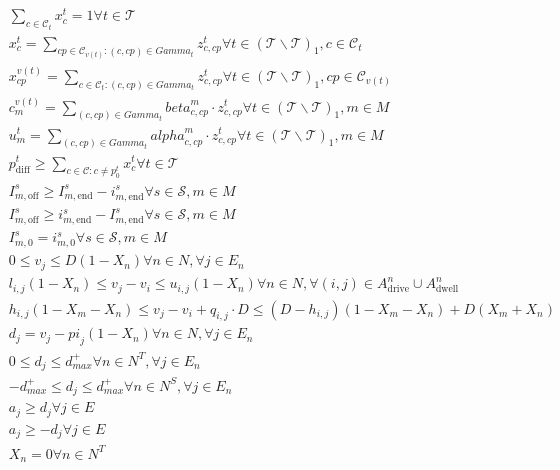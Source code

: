 \begin{align}
  & \sum_{c \in \mathcal{C}_{t}} x_{c}^{t} = 1 \forall t \in \mathcal{T} \tag{eq\_0003} \\
  & x_{c}^{t} = \sum_{cp \in \mathcal{C}_{v \left(t\right)} : \left(c , cp\right) \in \mathit{Gamma}_{t}} z_{c , cp}^{t} \forall t \in \left(\mathcal{T} \backslash \mathcal{T}\right)_{1} , c \in \mathcal{C}_{t} \tag{eq\_0004} \\
  & x_{cp}^{v \left(t\right)} = \sum_{c \in \mathcal{C}_{t} : \left(c , cp\right) \in \mathit{Gamma}_{t}} z_{c , cp}^{t} \forall t \in \left(\mathcal{T} \backslash \mathcal{T}\right)_{1} , cp \in \mathcal{C}_{v \left(t\right)} \tag{eq\_0005} \\
  & c_{m}^{v \left(t\right)} = \sum_{\left(c , cp\right) \in \mathit{Gamma}_{t}} \mathit{beta}_{c , cp}^{m} \cdot z_{c , cp}^{t} \forall t \in \left(\mathcal{T} \backslash \mathcal{T}\right)_{1} , m \in M \tag{eq\_0006} \\
  & u_{m}^{t} = \sum_{\left(c , cp\right) \in \mathit{Gamma}_{t}} \mathit{alpha}_{c , cp}^{m} \cdot z_{c , cp}^{t} \forall t \in \left(\mathcal{T} \backslash \mathcal{T}\right)_{1} , m \in M \tag{eq\_0007} \\
  & p_{\text{diff}}^{t} \geq \sum_{c \in \mathcal{C} : c \neq p_{0}^{t}} x_{c}^{t} \forall t \in \mathcal{T} \tag{eq\_0010} \\
  & I_{m , \text{off}}^{s} \geq I_{m , \text{end}}^{s} - i_{m , \text{end}}^{s} \forall s \in \mathcal{S} , m \in M \tag{eq\_0013} \\
  & I_{m , \text{off}}^{s} \geq i_{m , \text{end}}^{s} - I_{m , \text{end}}^{s} \forall s \in \mathcal{S} , m \in M \tag{eq\_0014} \\
  & I_{m , 0}^{s} = i_{m , 0}^{s} \forall s \in \mathcal{S} , m \in M \tag{eq\_0015} \\
  & 0 \leq v_{j} \leq D \left(1 - X_{n}\right) \forall n \in N , \forall j \in E_{n} \tag{eq\_0025} \\
  & l_{i , j} \left(1 - X_{n}\right) \leq v_{j} - v_{i} \leq u_{i , j} \left(1 - X_{n}\right) \forall n \in N , \forall \left(i , j\right) \in A_{\text{drive}}^{n} \cup A_{\text{dwell}}^{n} \tag{eq\_0026} \\
  & h_{i , j} \left(1 - X_{m} - X_{n}\right) \leq v_{j} - v_{i} + q_{i , j} \cdot D \leq \left(D - h_{i , j}\right) \left(1 - X_{m} - X_{n}\right) + D \left(X_{m} + X_{n}\right) \tag{eq\_0029} \\
  & d_{j} = v_{j} - \mathit{pi}_{j} \left(1 - X_{n}\right) \forall n \in N , \forall j \in E_{n} \tag{eq\_0031} \\
  & 0 \leq d_{j} \leq d_{max}^{+} \forall n \in N^{T} , \forall j \in E_{n} \tag{eq\_0032} \\
  & - d_{max}^{+} \leq d_{j} \leq d_{max}^{+} \forall n \in N^{S} , \forall j \in E_{n} \tag{eq\_0033} \\
  & a_{j} \geq d_{j} \forall j \in E \tag{eq\_0034} \\
  & a_{j} \geq - d_{j} \forall j \in E \tag{eq\_0035} \\
  & X_{n} = 0 \forall n \in N^{T} \tag{eq\_0036} \\
\end{align}
